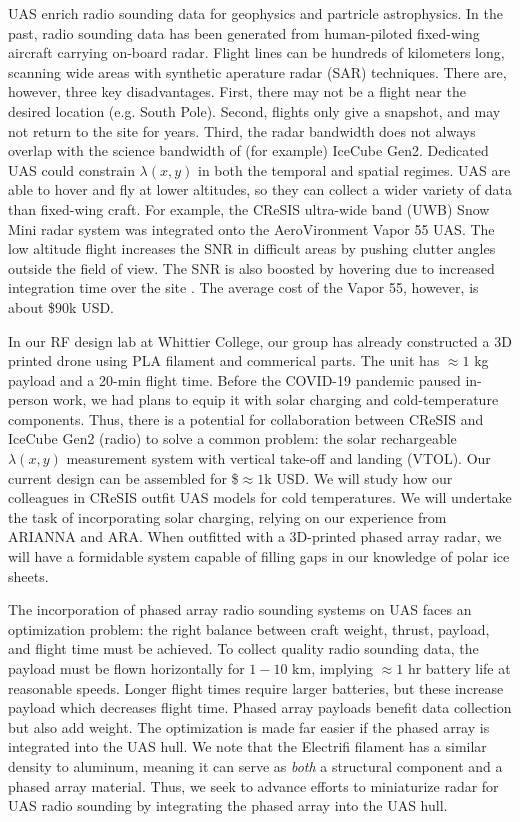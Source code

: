 \documentclass[11pt]{amsart}
\begin{document}
UAS enrich radio sounding data for geophysics and partricle astrophysics.  In the past, radio sounding data has been generated from human-piloted fixed-wing aircraft carrying on-board radar.  Flight lines can be hundreds of kilometers long, scanning wide areas with synthetic aperature radar (SAR) techniques.  There are, however, three key disadvantages.  First, there may not be a flight near the desired location (e.g. South Pole).  Second, flights only give a snapshot, and may not return to the site for years.  Third, the radar bandwidth does not always overlap with the science bandwidth of (for example) IceCube Gen2.  Dedicated UAS could constrain $\lambda(x,y)$ in both the temporal and spatial regimes.  UAS are able to hover and fly at lower altitudes, so they can collect a wider variety of data than fixed-wing craft.  For example, the CReSIS ultra-wide band (UWB) Snow Mini radar system was integrated onto the AeroVironment Vapor 55 UAS.  The low altitude flight increases the SNR in difficult areas by pushing clutter angles outside the field of view.  The SNR is also boosted by hovering due to increased integration time over the site \cite{arnold_2020}. The average cost of the Vapor 55, however, is about \$$90$k USD.  

In our RF design lab at Whittier College, our group has already constructed a 3D printed drone using PLA filament and commerical parts.  The unit has $\approx 1$ kg payload and a 20-min flight time.  Before the COVID-19 pandemic paused in-person work, we had plans to equip it with solar charging and cold-temperature components.  Thus, there is a potential for collaboration between CReSIS and IceCube Gen2 (radio) to solve a common problem: the solar rechargeable $\lambda(x,y)$ measurement system with vertical take-off and landing (VTOL).  Our current design can be assembled for \$$\approx 1$k USD.  We will study how our colleagues in CReSIS outfit UAS models for cold temperatures.  We will undertake the task of incorporating solar charging, relying on our experience from ARIANNA and ARA.  When outfitted with a 3D-printed phased array radar, we will have a formidable system capable of filling gaps in our knowledge of polar ice sheets.

The incorporation of phased array radio sounding systems on UAS faces an optimization problem: the right balance between craft weight, thrust, payload, and flight time must be achieved.  To collect quality radio sounding data, the payload must be flown horizontally for $1-10$ km, implying $\approx 1$ hr battery life at reasonable speeds.  Longer flight times require larger batteries, but these increase payload which decreases flight time.  Phased array payloads benefit data collection but also add weight.  The optimization is made far easier if the phased array is integrated into the UAS hull.  We note that the Electrifi filament has a similar density to aluminum, meaning it can serve as \textit{both} a structural component and a phased array material.  Thus, we seek to advance efforts to miniaturize radar for UAS radio sounding by integrating the phased array into the UAS hull.
\end{document}
